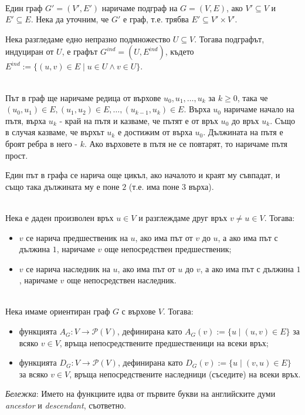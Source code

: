 \documentclass[12pt,twoside,a4paper]{article}
\begin{document}
	\begin{definitions}~\\
		\indent Един граф $G'=(V',E')$ наричаме подграф на $G=(V,E)$, ако $V' \subseteq V$ и $E' \subseteq E$. Нека да уточним, че $G'$ е граф, т.е. трябва $E' \subseteq V' \times V'$.
		
		Нека разгледаме едно непразно подмножество $U \subseteq V$. Тогава подграфът, индуциран от $U$, е графът $G^{ind}=(U, E^{ind})$, където $E^{ind} := \{(u,v) \in E \mid u \in U \land v \in U\}$.
	\end{definitions}
	
	\newpage
	\begin{definitions}~\\
		\indent Път в граф ще наричаме редица от върхове $u_0, u_1, \dots, u_k$ за $k \ge 0$, така че $(u_0, u_1) \in E, (u_1, u_2) \in E, \dots, (u_{k-1}, u_k) \in E$. Върха $u_0$ наричаме начало на пътя, върха $u_k$ - край на пътя и казваме, че пътят е от връх $u_0$ до връх $u_k$. Също в случая казваме, че върхът $u_k$ е достижим от върха $u_0$. Дължината на пътя е броят ребра в него - $k$. Ако върховете в пътя не се повтарят, то наричаме пътя прост.
		
		Един път в графа се нарича още цикъл, ако началото и краят му съвпадат, и също така дължината му е поне $2$ (т.е. има поне $3$ върха).
	\end{definitions}
	
	\begin{definitions}~\\
		\indent Нека е даден произволен връх $u \in V$ и разглеждаме друг връх $v \neq u \in V$. Тогава:
		\begin{itemize}
			\item $v$ се нарича предшественик на $u$, ако има път от $v$ до $u$, а ако има път с дължина $1$, наричаме $v$ още непосредствен предшественик;
			\item $v$ се нарича наследник на $u$, ако има път от $u$ до $v$, а ако има път с дължина $1$, наричаме $v$ още непосредствен наследник.
		\end{itemize}
	\end{definitions}
	
	\begin{definitions}~\\
		\indent Нека имаме ориентиран граф $G$ с върхове $V$. Тогава:
		\begin{itemize}
			\item функцията $A_G\colon V \to \mathcal{P}(V)$, дефинирана като $A_G(v):=\{u \mid (u, v) \in E\}$ за всяко $v \in V$, връща непосредствените предшественици на всеки връх;
			\item функцията $D_G\colon V \to \mathcal{P}(V)$, дефинирана като $D_G(v):=\{u \mid (v, u) \in E\}$ за всяко $v \in V$, връща непосредствените наследници (съседите) на всеки връх.
		\end{itemize}
		
		\textit{Бележка}: Името на функциите идва от първите букви на английските думи \textit{ancestor} и \textit{descendant}, съответно.
	\end{definitions}
	
\end{document}
